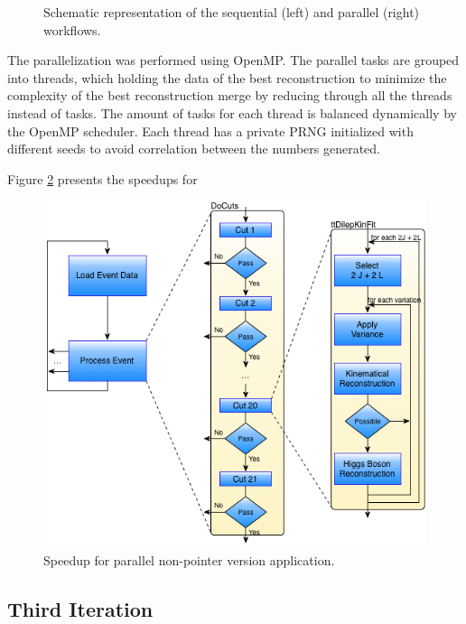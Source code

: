 \begin{figure}[!htp]
\begin{center}
		\caption{Schematic representation of the \ttDilepKinFit sequential (left) and parallel (right) workflows.}
		\label{fig:SeqPipeline}
	\end{center}
\end{figure}

The parallelization was performed using OpenMP. The parallel tasks are grouped into threads, which holding the data of the best reconstruction to minimize the complexity of the best reconstruction merge by reducing through all the threads instead of tasks. The amount of tasks for each thread is balanced dynamically by the OpenMP scheduler. Each thread has a private PRNG initialized with different seeds to avoid correlation between the numbers generated.

Figure \ref{fig:non_pointer_speedup} presents the speedups for 

\begin{figure}[!htp]
	\begin{center}
		\includegraphics[scale=0.4]{images/graf_abstract_flow_with_kinfit.png}
		\caption{Speedup for \tth parallel non-pointer version application.}
		\label{fig:non_pointer_speedup}
	\end{center}
\end{figure}

\subsection{Third Iteration}

